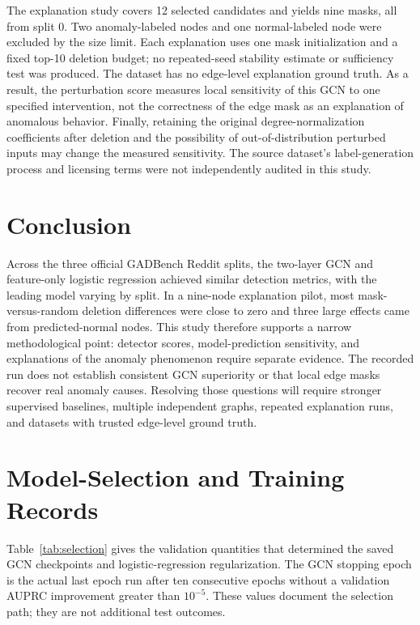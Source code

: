 \documentclass[11pt,a4paper]{article}
\begin{document}
The explanation study covers 12 selected candidates and yields nine masks, all from split 0. Two anomaly-labeled nodes and one normal-labeled node were excluded by the size limit. Each explanation uses one mask initialization and a fixed top-10 deletion budget; no repeated-seed stability estimate or sufficiency test was produced. The dataset has no edge-level explanation ground truth. As a result, the perturbation score measures local sensitivity of this GCN to one specified intervention, not the correctness of the edge mask as an explanation of anomalous behavior. Finally, retaining the original degree-normalization coefficients after deletion and the possibility of out-of-distribution perturbed inputs may change the measured sensitivity. The source dataset's label-generation process and licensing terms were not independently audited in this study.

\section{Conclusion}
Across the three official GADBench Reddit splits, the two-layer GCN and feature-only logistic regression achieved similar detection metrics, with the leading model varying by split. In a nine-node explanation pilot, most mask-versus-random deletion differences were close to zero and three large effects came from predicted-normal nodes. This study therefore supports a narrow methodological point: detector scores, model-prediction sensitivity, and explanations of the anomaly phenomenon require separate evidence. The recorded run does not establish consistent GCN superiority or that local edge masks recover real anomaly causes. Resolving those questions will require stronger supervised baselines, multiple independent graphs, repeated explanation runs, and datasets with trusted edge-level ground truth.

\appendix
\section{Model-Selection and Training Records}
Table~\ref{tab:selection} gives the validation quantities that determined the saved GCN checkpoints and logistic-regression regularization. The GCN stopping epoch is the actual last epoch run after ten consecutive epochs without a validation AUPRC improvement greater than $10^{-5}$. These values document the selection path; they are not additional test outcomes.
\end{document}
